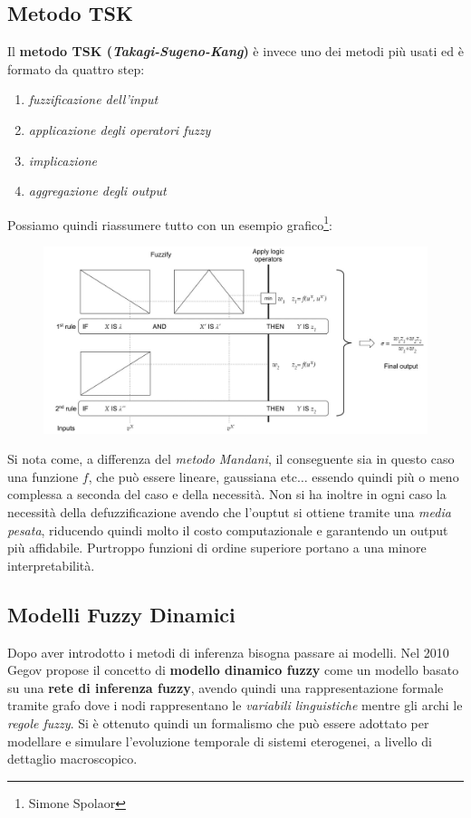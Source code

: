 \documentclass[a4paper,12pt, oneside]{book}
\begin{document}
\subsection{Metodo TSK}
Il \textbf{metodo TSK (\textit{Takagi-Sugeno-Kang})} è invece uno dei metodi più
usati ed è formato da quattro step:
\begin{enumerate}
  \item \textit{fuzzificazione dell'input}
  \item \textit{applicazione degli operatori fuzzy}
  \item \textit{implicazione}
  \item \textit{aggregazione degli output}
\end{enumerate}
Possiamo quindi riassumere tutto con un esempio grafico\footnote{Simone
  Spolaor}: 
\begin{figure}[H]
  \centering
  \includegraphics[scale = 0.27]{img/tsk.jpg}
\end{figure}
Si nota come, a differenza del \textit{metodo Mandani}, il conseguente sia in
questo caso una funzione $f$, che può essere lineare, gaussiana etc$\ldots$
essendo quindi più o meno complessa a seconda del caso e della necessità. Non si
ha inoltre in ogni caso la necessità della defuzzificazione avendo che l'ouptut
si ottiene tramite una \textit{media pesata}, riducendo quindi molto il costo
computazionale e garantendo un output più affidabile. Purtroppo funzioni di
ordine superiore portano a una minore interpretabilità.
\newpage
\subsection{Modelli Fuzzy Dinamici}
Dopo aver introdotto i metodi di inferenza bisogna passare ai modelli. Nel 2010
Gegov propose il concetto di \textbf{modello dinamico fuzzy} come un modello
basato su una \textbf{rete di inferenza fuzzy}, avendo quindi una
rappresentazione formale tramite grafo dove i nodi rappresentano le
\textit{variabili linguistiche} mentre gli archi le \textit{regole fuzzy}. Si è
ottenuto quindi un formalismo che può essere adottato per modellare e simulare
l'evoluzione temporale di sistemi eterogenei, a livello di dettaglio
macroscopico.
\end{document}
